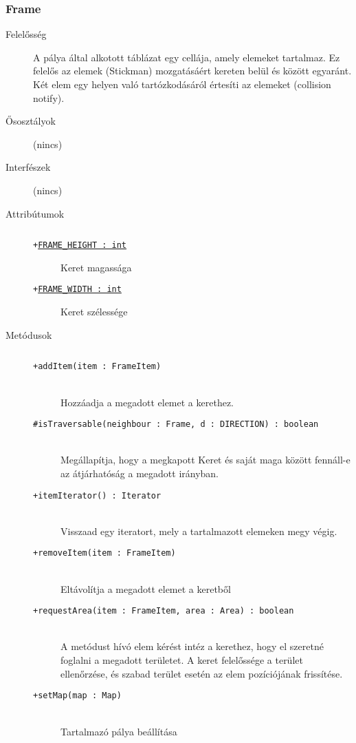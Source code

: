 		\subsubsection{Frame}
			\begin{description}

				\item[Felelősség] A pálya által alkotott táblázat egy cellája, amely elemeket tartalmaz. Ez felelős az elemek (Stickman) mozgatásáért kereten belül és között egyaránt. Két elem egy helyen való tartózkodásáról értesíti az elemeket (collision notify).

				\item[Ősosztályok] (nincs)
				\item[Interfészek] (nincs)
				\item[Attribútumok]$\ $
					\begin{description}
						\item[\texttt{+\underline{FRAME\_HEIGHT : int}}]Keret magassága
						\item[\texttt{+\underline{FRAME\_WIDTH : int}}]Keret szélessége
					\end{description}
				\item[Metódusok]$\ $
					\begin{description}
						\item[\texttt{+addItem(item : FrameItem)}] \hfill \\Hozzáadja a megadott elemet a kerethez. 
						\item[\texttt{\#isTraversable(neighbour : Frame, d : DIRECTION) : boolean}] \hfill \\Megállapítja, hogy a megkapott Keret és saját  maga között fennáll-e az átjárhatóság a  megadott irányban. 
						\item[\texttt{+itemIterator() : Iterator}] \hfill \\Visszaad egy iteratort, mely a tartalmazott  elemeken megy végig. 
						\item[\texttt{+removeItem(item : FrameItem)}] \hfill \\Eltávolítja a megadott elemet a keretből 
						\item[\texttt{+requestArea(item : FrameItem, area : Area) : boolean}] \hfill \\A metódust hívó elem kérést intéz a kerethez,  hogy el szeretné foglalni a megadott területet.  A keret felelőssége a terület ellenőrzése, és szabad  terület esetén az elem pozíciójának frissítése. 
						\item[\texttt{+setMap(map : Map)}] \hfill \\Tartalmazó pálya beállítása 
					\end{description}
			\end{description}


